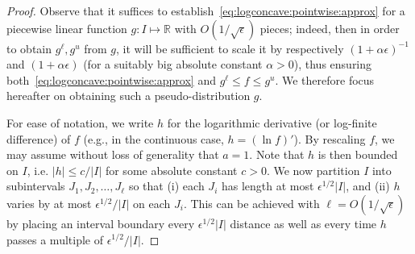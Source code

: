\documentclass[11pt]{article}
\theoremstyle{definition}
\newcommand{\R}{\mathbb{R}}
\newcommand{\eps}{\epsilon}
\newcommand{\abs}[1]{\lvert#1\rvert}
\renewcommand{\abs}[1]{\left\lvert #1 \right\rvert}
\newcommand{\bigO}[1]{{O\left( #1 \right)}}
\begin{document}
\begin{proof}
  Observe that it suffices to establish~\cref{eq:logconcave:pointwise:approx} for a piecewise linear function $g\colon I\mapsto \R$ with $\bigO{1/\sqrt{\eps}}$ pieces; indeed, then in order to obtain $g^\ell,g^u$ from $g$, it will be sufficient to scale it by respectively $(1+\alpha\eps)^{-1}$ and  $(1+\alpha\eps)$ (for a suitably big absolute constant $\alpha>0$), thus ensuring both~\cref{eq:logconcave:pointwise:approx} and $g^\ell\leq f\leq g^u$. We therefore focus hereafter on obtaining such a pseudo-distribution $g$.

  For ease of notation, we write $h$ for the logarithmic derivative (or log-finite difference) of $f$ (e.g., in the continuous case, $h=(\ln f)'$). By rescaling $f$, we may assume without loss of generality that $a=1$. Note that $h$ is then bounded on $I$, i.e. $\abs{h}\leq {c}/{\abs{I}}$ for some absolute constant $c>0$.  We now partition $I$ into subintervals $J_1,J_2,\ldots,J_\ell$ so that (i) each $J_i$ has length at most $\eps^{1/2}\abs{I}$, and (ii) $h$ varies by at most $\eps^{1/2}/\abs{I}$ on each $J_i$. This can be achieved with $\ell=\bigO{1/\sqrt{\eps}}$ by placing an interval boundary every $\eps^{1/2}\abs{I}$ distance as well as every time $h$ passes a multiple of $\eps^{1/2}/\abs{I}$.


\end{proof}
\end{document}
